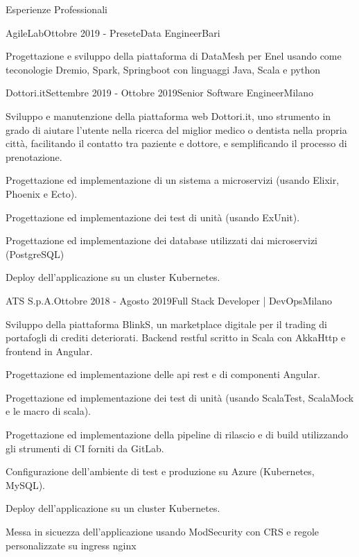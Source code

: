 \documentclass{resume} %
\begin{document}

\begin{rSection}{Esperienze Professionali}

\begin{rSubsection}{AgileLab}{Ottobre 2019 - Presete}{Data Engineer}{Bari}
\item Progettazione e sviluppo della piattaforma di DataMesh per Enel usando come teconologie Dremio, Spark, Springboot con linguaggi Java, Scala e python
\end{rSubsection}

\begin{rSubsection}{Dottori.it}{Settembre 2019 - Ottobre 2019}{Senior Software Engineer}{Milano}
\item Sviluppo e manutenzione della piattaforma web Dottori.it, uno strumento in grado di aiutare l'utente nella ricerca
del miglior medico o dentista nella propria citt\`a, facilitando il contatto tra paziente e dottore, e semplificando il
processo di prenotazione.
\item Progettazione ed implementazione di un sistema a microservizi (usando Elixir, Phoenix e Ecto).
\item Progettazione ed implementazione dei test di unit\`a (usando ExUnit).
\item Progettazione ed implementazione dei database utilizzati dai microservizi (PostgreSQL)
\item Deploy dell'applicazione su un cluster Kubernetes.
\end{rSubsection}

\begin{rSubsection}{ATS S.p.A.}{Ottobre 2018 - Agosto 2019}{Full Stack Developer | DevOps}{Milano}
\item Sviluppo della piattaforma BlinkS, un marketplace digitale per il trading di portafogli di crediti deteriorati.
Backend restful scritto in Scala con AkkaHttp e frontend in Angular.
\item Progettazione ed implementazione delle api rest e di componenti Angular.
\item Progettazione ed implementazione dei test di unit\`a (usando ScalaTest, ScalaMock e le macro di scala).
\item Progettazione ed implementazione della pipeline di rilascio e di build utilizzando gli strumenti di CI forniti da GitLab.
\item Configurazione dell'ambiente di test e produzione su Azure (Kubernetes, MySQL).
\item Deploy dell'applicazione su un cluster Kubernetes.
\item Messa in sicuezza dell'applicazione usando ModSecurity con CRS e regole personalizzate su ingress nginx
\end{rSubsection}


\end{rSection}
\end{document}
